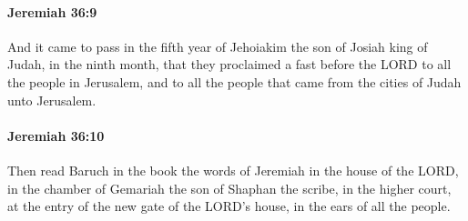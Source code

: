 		\paragraph{Jeremiah 36:9} %
			\label{JEREMIAH-36-9}

			And it came to pass in the fifth year of Jehoiakim the son of Josiah king of Judah, in the ninth month, that they proclaimed a fast before the LORD to all the people in Jerusalem, and to all the people that came from the cities of Judah unto Jerusalem.


		\paragraph{Jeremiah 36:10} %
			\label{JEREMIAH-36-10}

			Then read Baruch in the book the words of Jeremiah in the house of the LORD, in the chamber of Gemariah the son of Shaphan the scribe, in the higher court, at the entry of the new gate of the LORD’s house, in the ears of all the people.

